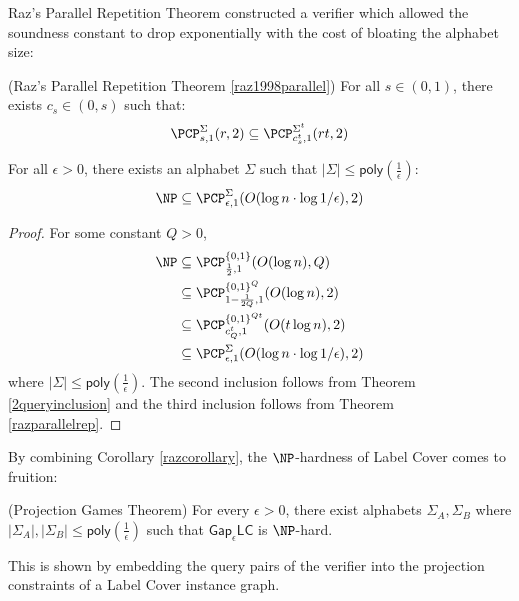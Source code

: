 %
Raz's Parallel Repetition Theorem constructed a verifier which allowed the soundness constant to drop exponentially with the cost of bloating the alphabet size:
\begin{theorem} (Raz's Parallel Repetition Theorem \ref{raz1998parallel}) \label{razparallelrep}
  For all $s \in (0,1)$, there exists $c_s \in (0,s)$ such that:
    \[ \PCP^{\Sigma}_{s,1}(r,2) \subseteq \PCP^{\Sigma^t}_{c_s^t,1}(rt,2)  \]
\end{theorem}

\begin{corollary} \label{razcorollary} For all $\epsilon > 0$, there exists an alphabet $\Sigma$ such that $|\Sigma| \leq \mathsf{poly}(\frac{1}{\epsilon})$:
  $$ \NP \subseteq \PCP^{\Sigma}_{\epsilon,1}(O(\log{n}\cdot\log{1/\epsilon}),2) $$
\end{corollary}
%
\begin{proof}
  For some constant $Q > 0$,
  \begin{align*}
    \NP & \subseteq \PCP_{\frac{1}{2},1}^{\{0,1\}}(O(\log{n}), Q) \\
    & \subseteq \PCP_{1- \frac{1}{2Q},1}^{\{0,1\}^Q}(O(\log{n}), 2) \\
    & \subseteq \PCP_{c_Q^t,1}^{\{0,1\}^{Qt}}(O(t\log{n}), 2) \\
    & \subseteq   \PCP_{\epsilon,1}^{\Sigma}(O(\log{n}\cdot\log{1/\epsilon}), 2)
  \end{align*}
  where $|\Sigma| \leq \mathsf{poly}(\frac{1}{\epsilon})$. The second inclusion follows from Theorem \ref{2queryinclusion} and the third inclusion follows from Theorem \ref{razparallelrep}.
\end{proof}


By combining Corollary \ref{razcorollary}, the $\NP$-hardness of Label Cover comes to fruition:

\begin{theorem} (Projection Games Theorem) \label{labelcoverhard}
  For every $\epsilon > 0$, there exist alphabets $\Sigma_A, \Sigma_B$ where $|\Sigma_A|,|\Sigma_B| \leq \mathsf{poly}(\frac{1}{\epsilon})$ such that $\mathsf{Gap}_\epsilon\mathsf{LC}$ is $\NP$-hard.
\end{theorem}

This is shown by embedding the query pairs of the verifier into the projection constraints of a Label Cover instance graph.
